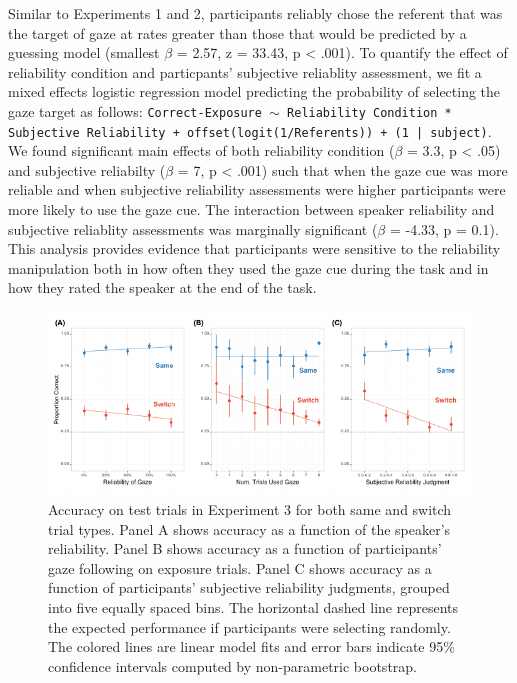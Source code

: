 \documentclass[authoryear, review]{elsarticle}
\newenvironment{CodeChunk}{}{}
\begin{document}
Similar to Experiments 1 and 2, participants reliably chose the referent
that was the target of gaze at rates greater than those that would be
predicted by a guessing model (smallest \(\beta\) = 2.57, z = 33.43, p
\textless{} .001). To quantify the effect of reliability condition and
particpants' subjective reliablity assessment, we fit a mixed effects
logistic regression model predicting the probability of selecting the
gaze target as follows:
\texttt{Correct-Exposure $\sim$ Reliability Condition * Subjective Reliability + offset(logit(1/Referents)) + (1 | subject)}.
We found significant main effects of both reliability condition
(\(\beta\) = 3.3, p \textless{} .05) and subjective reliabilty
(\(\beta\) = 7, p \textless{} .001) such that when the gaze cue was more
reliable and when subjective reliability assessments were higher
participants were more likely to use the gaze cue. The interaction
between speaker reliability and subjective reliablity assessments was
marginally significant (\(\beta\) = -4.33, p = 0.1). This analysis
provides evidence that participants were sensitive to the reliability
manipulation both in how often they used the gaze cue during the task
and in how they rated the speaker at the end of the task.

\begin{CodeChunk}
\begin{figure}[tb]
\includegraphics{figs/expt3-plot-1} \caption[Accuracy on test trials in Experiment 3 for both same and switch trial types]{Accuracy on test trials in Experiment 3 for both same and switch trial types. Panel A shows accuracy as a function of the speaker's reliability. Panel B shows accuracy as a function of participants' gaze following on exposure trials. Panel C shows accuracy as a function of participants' subjective reliability judgments, grouped into five equally spaced bins. The horizontal dashed line represents the expected performance if participants were selecting randomly. The colored lines are linear model fits and error bars indicate 95\% confidence intervals computed by non-parametric bootstrap.}\label{fig:expt3-plot}
\end{figure}
\end{CodeChunk}
\end{document}
